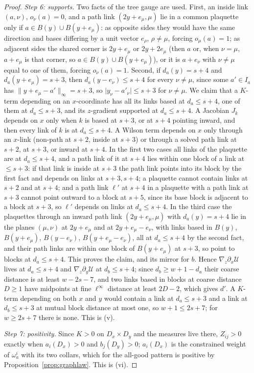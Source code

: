 \documentclass[11pt]{amsart}
\theoremstyle{definition}
\theoremstyle{remark}
\numberwithin{equation}{section}
\begin{document}
\begin{proof}
\emph{Step 6: supports.} Two facts of the tree gauge are used. First, an
inside link $(a,\nu)$, $o_\nu(a)=0$, and a path link $(2y+e_\mu,\mu)$ lie
in a common plaquette only if $a\in B(y)\cup B(y+e_\mu)$: as opposite
sides they would have the same direction and bases differing by a unit
vector $e_\rho$, $\rho\ne\mu$, forcing $o_\mu(a)=1$; as adjacent sides the
shared corner is $2y+e_\mu$ or $2y+2e_\mu$ (then $a$ or, when $\nu=\mu$,
$a+e_\mu$ is that corner, so $a\in B(y)\cup B(y+e_\mu)$), or it is
$a+e_\nu$ with $\nu\ne\mu$ equal to one of them, forcing $o_\nu(a)=1$.
Second, if $d_a(y)=s+4$ and $d_a(y+e_\mu)=s+3$, then $d_a(y-e_\nu)\le s+4$
for every $\nu\ne\mu$, since some $a'\in I_a$ has
$\lVert y+e_\mu-a'\rVert_\infty=s+3$, so $\lvert y_\nu-a'_\nu\rvert\le
s+3$ for $\nu\ne\mu$. We claim that a $K$-term depending on an
$x$-coordinate has all its links based at $d_a\le s+4$, one of them at
$d_a\le s+3$, and its $z$-gradient supported at $d_a\le s+4$. A Jacobian
$J_k$ depends on $x$ only when $k$ is based at $s+3$, or at $s+4$ pointing
inward, and then every link of $k$ is at $d_a\le s+4$. A Wilson term
depends on $x$ only through an $x$-link (non-path at $s+2$, inside at
$s+3$) or through a solved path link at $s+2$, at $s+3$, or inward at
$s+4$. In the first two cases all links of the plaquette are at
$d_a\le s+4$, and a path link of it at $s+4$ lies within one block of a
link at $\le s+3$: if that link is inside at $s+3$ the path link points
into its block by the first fact and depends on links at $s+3,s+4$; a
plaquette cannot contain links at $s+2$ and at $s+4$; and a path link
$\ell'$ at $s+4$ in a plaquette with a path link at $s+3$ cannot point
outward to a block at $s+5$, since its base block is adjacent to a block
at $s+3$, so $\ell'$ depends on links at $d_a\le s+4$. In the third case
the plaquettes through an inward path link $(2y+e_\mu,\mu)$ with
$d_a(y)=s+4$ lie in the planes $(\mu,\nu)$ at $2y+e_\mu$ and at
$2y+e_\mu-e_\nu$, with links based in $B(y)$, $B(y+e_\mu)$, $B(y-e_\nu)$,
$B(y+e_\mu-e_\nu)$, all at $d_a\le s+4$ by the second fact, and their
path links are within one block of $B(y+e_\mu)$ at $s+3$, so point to
blocks at $d_a\le s+4$. This proves the claim, and its mirror for $b$.
Hence $\nabla_z\partial_x\mathcal U$ lives at $d_a\le s+4$ and
$\nabla_z\partial_y\mathcal U$ at $d_b\le s+4$; since
$d_b\ge w+1-d_a$ their coarse distance is at least $w-2s-7$, and two
links based in blocks at coarse distance $D\ge1$ have midpoints at fine
$\ell^\infty$ distance at least $2D-2$, which gives $d'$. A $K$-term
depending on both $x$ and $y$ would contain a link at $d_a\le s+3$ and a
link at $d_b\le s+3$ at mutual block distance at most one, so
$w+1\le2s+7$; for $w\ge2s+7$ there is none. This is (v).

\emph{Step 7: positivity.} Since $K>0$ on $D_x\times D_y$ and the
measures live there, $Z_{ij}>0$ exactly when $a_i(D_x)>0$ and
$b_j(D_y)>0$; $a_i(D_x)$ is the constrained weight of $\omega_a^i$ with
its two collars, which for the all-good pattern is positive by
Proposition~\ref{prop:graphlaw}. This is (vi).
\end{proof}
\end{document}
